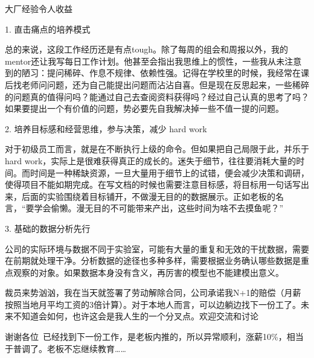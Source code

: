 大厂经验令人收益

1. 直击痛点的培养模式

总的来说，这段工作经历还是有点tough。除了每周的组会和周报以外，我的mentor还让我写每日工作计划。他甚至会指出我思维上的惯性，一些我从未注意到的陋习：提问稀碎、作息不规律、依赖性强。记得在学校里的时候，我经常在课后找老师问问题，还为自己能提出问题而沾沾自喜。但是现在反思起来，一些稀碎的问题真的值得问吗？能通过自己去查阅资料获得吗？经过自己认真的思考了吗？如果要提出一个有价值的问题，势必要先自我解决掉一些不值一提的问题。

2. 培养目标感和经营思维，参与决策，减少 hard work

对于初级员工而言，就是在不断执行上级的命令。但如果把自己局限于此，并乐于 hard work，实际上是很难获得真正的成长的。迷失于细节，往往要消耗大量的时间。而时间是一种稀缺资源，一旦大量用于细节上的试错，便会减少决策和调研，使得项目不能如期完成。在写文档的时候也需要注意目标感，将目标用一句话写出来，后面的实验围绕着目标铺开，不做漫无目的的数据展示。正如老板的名言，“要学会偷懒。漫无目的不可能带来产出，这些时间为啥不去摸鱼呢？”

3. 基础的数据分析先行

公司的实际环境与数据不同于实验室，可能有大量的重复和无效的干扰数据，需要在前期就处理干净。分析数据的途径也多种多样，需要根据业务确认哪些数据是重点观察的对象。如果数据本身没有含义，再厉害的模型也不能建模出意义。

裁员来势汹汹，我在当天就签署了劳动解除合同，公司承诺我N+1的赔偿（月薪按照当地月平均工资的3倍计算）。对于本地人而言，可以边躺边找下一份工了。未来不知道会如何，也许这会是我人生的一个分叉点。欢迎交流和讨论~

谢谢各位~已经找到下一份工作，是老板内推的，所以异常顺利，涨薪10\%，相当于普调了。老板不忘继续教育……

